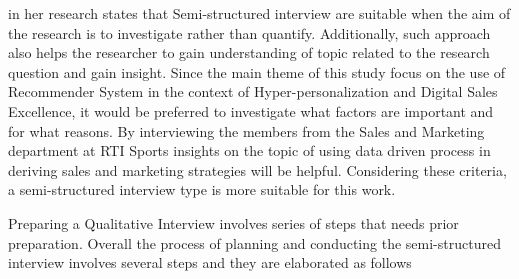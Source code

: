 \textcite[65]{fylan2005semi} in her research states that Semi-structured interview are suitable when the aim of the research is to investigate rather than quantify. Additionally, such approach also helps the researcher to gain understanding of topic related to the research question and gain insight. Since the main theme of this study focus on the use of Recommender System in the context of Hyper-personalization and Digital Sales Excellence, it would be preferred to investigate what factors are important and for what reasons. By interviewing the members from the Sales and Marketing department at RTI Sports insights on the topic of using data driven process in deriving sales and marketing strategies will be helpful. Considering these criteria, a semi-structured interview type is more suitable for this work.  \\
\par
Preparing a Qualitative Interview involves series of steps that needs prior preparation. Overall the process of planning and conducting the semi-structured interview involves several steps and they are elaborated as follows
